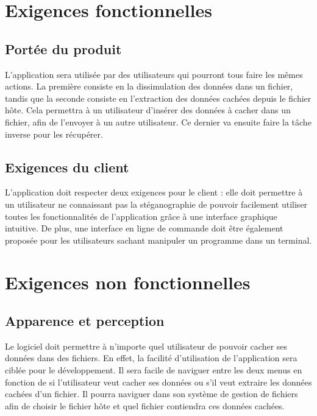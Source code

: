 \documentclass[11pt]{article}
\begin{document}
\section{Exigences fonctionnelles}

\subsection{Portée du produit}

L'application sera utilisée par des utilisateurs qui pourront tous faire les
mêmes actions. La première consiste en la dissimulation des données dans un
fichier, tandis que la seconde consiste en l'extraction des données cachées
depuis le fichier hôte. Cela permettra à un utilisateur d'insérer des données à
cacher dans un fichier, afin de l'envoyer à un autre utilisateur. Ce dernier va
ensuite faire la tâche inverse pour les récupérer.

\subsection{Exigences du client}

L'application doit respecter deux exigences pour le client : elle doit permettre
à un utilisateur ne connaissant pas la stéganographie de pouvoir facilement
utiliser toutes les fonctionnalités de l'application grâce à une interface
graphique intuitive. De plus, une interface en ligne de commande doit être
également proposée pour les utilisateurs sachant manipuler un programme dans un
terminal. 

\section{Exigences non fonctionnelles}

\subsection{Apparence et perception}

Le logiciel doit permettre à n'importe quel utilisateur de pouvoir cacher ses
données dans des fichiers. En effet, la facilité d'utilisation de l'application
sera ciblée pour le développement. Il sera facile de naviguer entre les deux
menus en fonction de si l'utilisateur veut cacher ses données ou s'il veut
extraire les données cachées d'un fichier. Il pourra naviguer dans son système
de gestion de fichiers afin de choisir le fichier hôte et quel fichier
contiendra ces données cachées. 
\end{document}
